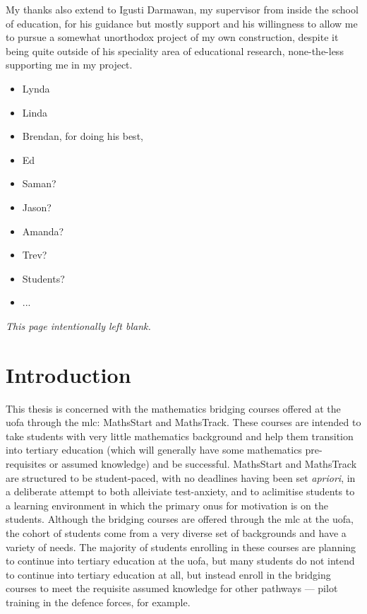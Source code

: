 \documentclass[twoside,12pt,a4paper]{report}
\makeatletter
\newcommand*{\intentionallyblankpage}{
  \vspace*{\fill}
  {\centering \textit{This page intentionally left blank.} \par}
  \vspace{\fill}}
\renewcommand*{\cleardoublepage}{\clearpage\if@twoside \ifodd\c@page\else
  \intentionallyblankpage
  \newpage
  \if@twocolumn\hbox{}\newpage\fi\fi\fi}
\makeatother
\begin{document}
My thanks also extend to Igusti Darmawan, my supervisor from inside the school of education, for his guidance but mostly support and his willingness to allow me to pursue a somewhat unorthodox project of my own construction, despite it being quite outside of his speciality area of educational research, none-the-less supporting me in my project.

\begin{itemize}
	\item Lynda 
	\item Linda
	\item Brendan, for doing his best,
	\item Ed 
	\item Saman?
	\item Jason?
	\item Amanda?
	\item Trev?
	\item Students?
	\item ...
\end{itemize}





\cleardoublepage
\chapter{Introduction}
\label{chap:intro}

\glsresetall

This thesis is concerned with the mathematics bridging courses offered at the \gls{uofa} through the \gls{mlc}: MathsStart and MathsTrack. These courses are intended to take students with very little mathematics background and help them transition into tertiary education (which will generally have some mathematics pre-requisites or assumed knowledge) and be successful. MathsStart and MathsTrack are structured to be student-paced, with no deadlines having been set \textit{apriori}, in a deliberate attempt to both alleiviate test-anxiety, and to aclimitise students to a learning environment in which the primary onus for motivation is on the students. Although the bridging courses are offered through the \gls{mlc} at the \gls{uofa}, the cohort of students come from a very diverse set of backgrounds and have a variety of needs. The majority of students enrolling in these courses are planning to continue into tertiary education at the \gls{uofa}, but many students do not intend to continue into tertiary education at all, but instead enroll in the bridging courses to meet the requisite assumed knowledge for other pathways --- pilot training in the defence forces, for example. 
\end{document}
